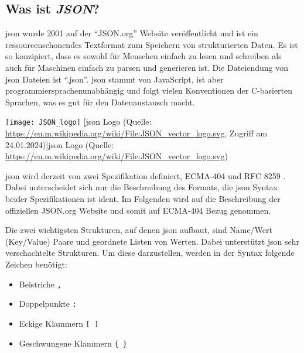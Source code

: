 \subsection{Was ist \textit{JSON}?}\label{json_kapitel}
\begin{minipage}{0.6\textwidth}
	\acf{json} wurde 2001 auf der \enquote{JSON.org} Website veröffentlicht und ist ein ressourcenschonendes Textformat zum Speichern von strukturierten Daten. Es ist so konzipiert, dass es sowohl für Menschen einfach zu lesen und schreiben als auch für Maschinen einfach zu parsen und generieren ist. Die Dateiendung von \ac{json} Dateien ist \enquote{.json}. \ac{json} stammt von JavaScript, ist aber programmiersprachenunabhängig und folgt vielen Konventionen der C-basierten Sprachen, was es gut für den Datenaustausch macht. \cite[vgl.][]{json_org:o.J., ECMA:2017}
\end{minipage}%
\hfill
\begin{minipage}{0.37\textwidth}
	\centering	
	\texttt{[image: JSON\_logo]}
	[\ac{json} Logo (Quelle: \url{https://en.m.wikipedia.org/wiki/File:JSON_vector_logo.svg}, Zugriff am 24.01.2024)]{\ac{json} Logo (Quelle:\\
		 \url{https://en.m.wikipedia.org/wiki/File:JSON_vector_logo.svg}) \label{fig:json_logo}}
\end{minipage}
\vspace{1ex}

\ac{json} wird derzeit von zwei Spezifikation definiert, ECMA-404 \cite[vgl.][]{ECMA:2017} und RFC 8259 \cite[vgl.][]{Bray:2017}. Dabei unterscheidet sich nur die Beschreibung des Formats, die \ac{json} Syntax beider Spezifikationen ist ident. Im Folgenden wird auf die Beschreibung der offiziellen JSON.org Website \cite[vgl.][]{json_org:o.J.} und somit auf ECMA-404 \cite[vgl.][]{ECMA:2017} Bezug genommen.

Die zwei wichtigsten Strukturen, auf denen \ac{json} aufbaut, sind Name/Wert (\engl Key/Value) Paare und geordnete Listen von Werten. Dabei unterstützt \ac{json} sehr verschachtelte Strukturen. Um diese darzustellen, werden in der Syntax folgende Zeichen benötigt:
\begin{itemize}
	 \item Beistriche \lstinline|,|
	 \item Doppelpunkte \lstinline|:|
	 \item Eckige Klammern \lstinline|[ ]|
	 \item Geschwungene Klammern \lstinline|{ }|
\end{itemize}


